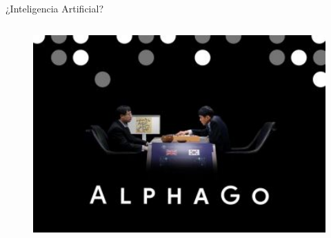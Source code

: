 \documentclass[10pt]{beamer}
\begin{document}
\begin{frame}{¿Inteligencia Artificial?}
\begin{columns}
\begin{column}{0.32\textwidth}
\begin{figure}[!h]
                \centering
                \includegraphics[width=1\textwidth]{img/alphago}
            \end{figure}                
        \end{column}
    \end{columns}
    
\end{frame}
\end{document}

